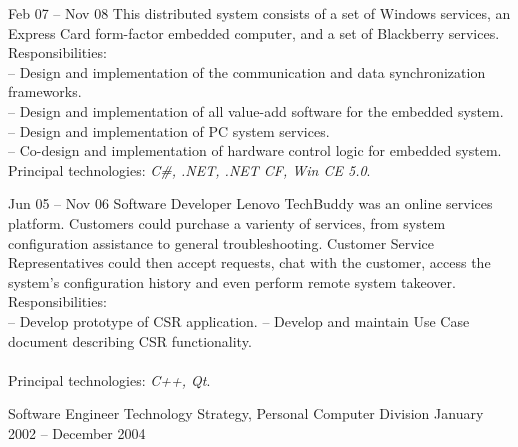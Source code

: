 \documentclass[letterpaper, 11pt]{article}
\begin{document}
\begin{resume}
\begin{block}
\begin{subcategory}{Feb 07 -- Nov 08}
                This distributed system consists of a set of Windows services, an Express Card
                form-factor embedded computer, and a set of Blackberry services.
                \\[1ex]
                Responsibilities: \\
                -- Design and implementation of the communication and data synchronization frameworks. \\
                -- Design and implementation of all value-add software for the embedded system. \\
                -- Design and implementation of PC system services. \\
                -- Co-design and implementation of hardware control logic for embedded system.
                \\[1ex]
                Principal technologies: \emph{C\#, .NET, .NET CF, Win CE 5.0}.
                \bigskip
            \end{subcategory}
            \begin{subcategory}{Jun 05 -- Nov 06}
                 {Software Developer}
                Lenovo TechBuddy was an online services platform.  Customers could purchase
                a varienty of services, from system configuration assistance to general
                troubleshooting.  Customer Service Representatives could then accept requests,
                chat with the customer, access the system's configuration history and even
                perform remote system takeover.
                \\[1ex]
                Responsibilities: \\
                -- Develop prototype of CSR application.
                -- Develop and maintain Use Case document describing CSR functionality. \\
                \\[1ex]
                Principal technologies: \emph{C++, Qt}.
                \bigskip
                \bigskip
            \end{subcategory}
        \end{block}
        \begin{block}
            \begin{category}{}
                                                             {Software Engineer}
                         {Technology Strategy, Personal Computer Division} {January 2002 -- December 2004}
                \smallskip

\end{category}
\end{block}
\end{resume}
\end{document}
